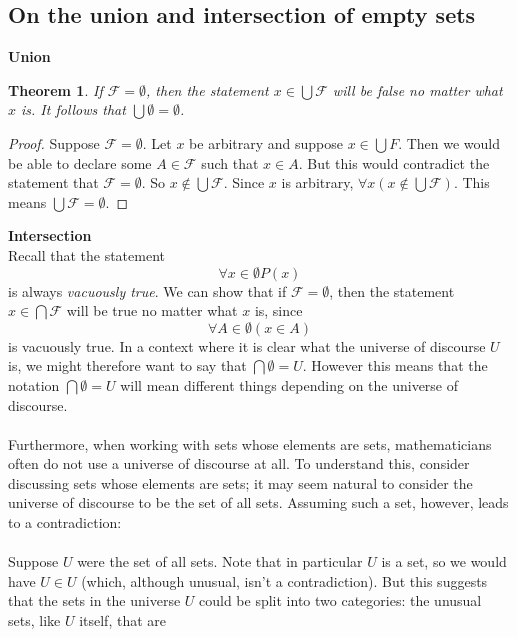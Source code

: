 \documentclass{report}
\newtheorem*{theorem}{Theorem}
\theoremstyle{definition}
\begin{document}
\subsection{On the union and intersection of empty sets}
\textbf{Union}
\begin{theorem}
If $\mathcal F=\emptyset$, then the statement $x\in\bigcup\mathcal F$ will be false no matter what $x$ is. It follows that $\bigcup\emptyset=\emptyset$.
\end{theorem}
\begin{proof}
Suppose $\mathcal F=\emptyset$. Let $x$ be arbitrary and suppose $x\in\bigcup F$. Then we would be able to declare some $A\in\mathcal F$ such that $x\in A$. But this would
contradict the statement that $\mathcal F=\emptyset$. So $x\notin\bigcup\mathcal F$. Since $x$ is arbitrary, $\forall x(x\notin\bigcup\mathcal F)$. This means $\bigcup\mathcal F=\emptyset$.
\end{proof}
\noindent\textbf{Intersection}\\
Recall that the statement
\begin{equation*}
\forall x\in\emptyset P(x)
\end{equation*}
is always \textit{vacuously true}. We can show that if $\mathcal F=\emptyset$, then the statement $x\in\bigcap\mathcal F$ will be true no matter what $x$ is, since
\begin{equation*}
\forall A\in\emptyset(x\in A)
\end{equation*}
is vacuously true. In a context where it is clear what the universe of discourse $U$ is, we might therefore want to say that $\bigcap\emptyset=U$. However this means that the notation
$\bigcap\emptyset=U$ will mean different things depending on the universe of discourse.\\
\vspace{1mm}\\
Furthermore, when working with sets whose elements are sets, mathematicians often do not use a universe of discourse at all. To understand this, consider discussing sets whose elements are sets; it
may seem natural to consider the universe of discourse to be the set of all sets. Assuming such a set, however, leads to a contradiction:\\
\vspace{1mm}\\
Suppose $U$ were the set of all sets. Note that in particular $U$ is a set, so we would have $U\in U$ (which, although unusual, isn't a contradiction). But this suggests that the sets
in the universe $U$ could be split into two categories: the unusual sets, like $U$ itself, that are
\end{document}
